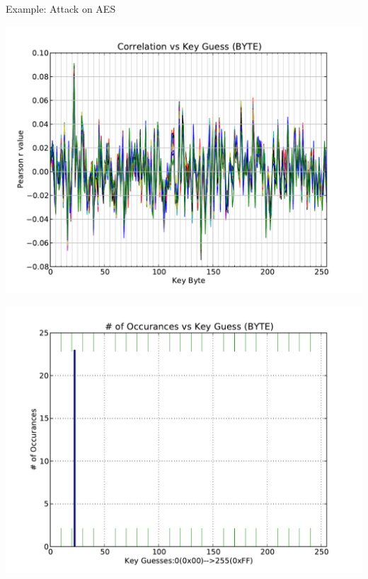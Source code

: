 \documentclass[xcolor=pdftex,dvipsnames,table,final]{beamer}
\begin{document}
\begin{frame}[fragile]{}
\begin{columns}[t]
\begin{column}{.31\linewidth}
\begin{block}{Example: Attack on AES}
        \begin{minipage}[t]{0.49\linewidth}
           \includegraphics[width=1.0\linewidth]{../figures/pearsonsCoActual}
        \end{minipage}%
        \begin{minipage}[t]{0.49\linewidth}  
		\includegraphics[width=1.0\linewidth]{../figures/histPearsonsCoActual}
        \end{minipage}
        \vspace{-3.8ex}
       \end{block}
%          
%          
   \end{column}
\end{columns}

\end{frame}
\end{document}
